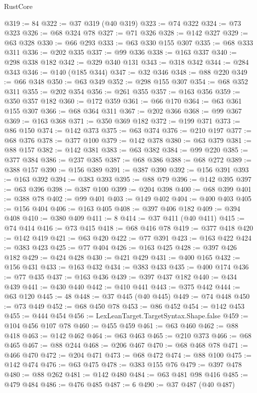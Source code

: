 \begin{lexlean}{RustCore}
\begin{coremodule}
@319 := 84
@322 := @37 @319 (@40 @319)
@323 := @74 @322
@324 := @73 @323
@326 := @68 @324 @78
@327 := @71 @326
@328 := @142 @327
@329 := @63 @328
@330 := @66 @293
@333 := @63 @330 @155 @307
@335 := @68 @333 @311
@336 := @202 @335
@337 := @99 @336
@338 := @163 @337
@340 := @298 @338 @182
@342 := @329 @340 @131
@343 := @318 @342
@344 := @284 @343
@346 := @140 (@185 @344)
@347 := @32 @346
@348 := @88 @220
@349 := @66 @348
@350 := @63 @349
@352 := @298 @155 @307
@354 := @68 @352 @311
@355 := @202 @354
@356 := @261 @355
@357 := @163 @356
@359 := @350 @357 @182
@360 := @172 @359
@361 := @66 @170
@364 := @63 @361 @155 @307
@366 := @68 @364 @311
@367 := @202 @366
@368 := @99 @367
@369 := @163 @368
@371 := @350 @369 @182
@372 := @199 @371
@373 := @86 @150
@374 := @142 @373
@375 := @63 @374
@376 := @210 @197
@377 := @68 @376
@378 := @377 @100
@379 := @142 @378
@380 := @63 @379
@381 := @88 @157
@382 := @142 @381
@383 := @63 @382
@384 := @99 @220
@385 := @377 @384
@386 := @237 @385
@387 := @68 @386
@388 := @68 @272
@389 := @388 @157
@390 := @156 @389
@391 := @387 @390
@392 := @156 @391
@393 := @163 @392
@394 := @383 @393
@395 := @88 @79
@396 := @142 @395
@397 := @63 @396
@398 := @387 @100
@399 := @204 @398
@400 := @68 @399
@401 := @388 @78
@402 := @99 @401
@403 := @149 @402
@404 := @400 @403
@405 := @156 @404
@406 := @163 @405
@408 := @397 @406 @182
@409 := @394 @408
@410 := @380 @409
@411 := 8
@414 := @37 @411 (@40 @411)
@415 := @74 @414
@416 := @73 @415
@418 := @68 @416 @78
@419 := @377 @418
@420 := @142 @419
@421 := @63 @420
@422 := @77 @391
@423 := @163 @422
@424 := @383 @423
@425 := @77 @404
@426 := @163 @425
@428 := @397 @426 @182
@429 := @424 @428
@430 := @421 @429
@431 := @400 @165
@432 := @156 @431
@433 := @163 @432
@434 := @383 @433
@435 := @400 @174
@436 := @77 @435
@437 := @163 @436
@439 := @397 @437 @182
@440 := @434 @439
@441 := @430 @440
@442 := @410 @441
@443 := @375 @442
@444 := @63 @120
@445 := 48
@448 := @37 @445 (@40 @445)
@449 := @74 @448
@450 := @73 @449
@452 := @68 @450 @78
@453 := @86 @452
@454 := @142 @453
@455 := @444 @454
@456 := LexLeanTarget.TargetSyntax.Shape.false
@459 := @104 @456 @107 @78
@460 := @455 @459
@461 := @63 @460
@462 := @88 @418
@463 := @142 @462
@464 := @63 @463
@465 := @210 @373
@466 := @68 @465
@467 := @88 @244
@468 := @206 @467
@470 := @68 @468 @78
@471 := @466 @470
@472 := @204 @471
@473 := @68 @472
@474 := @88 @100
@475 := @142 @474
@476 := @63 @475
@478 := @383 @155 @76
@479 := @397 @478
@480 := @88 @262
@481 := @142 @480
@484 := @63 @481 @98 @416
@485 := @479 @484
@486 := @476 @485
@487 := 6
@490 := @37 @487 (@40 @487)

\end{coremodule}
\end{lexlean}
